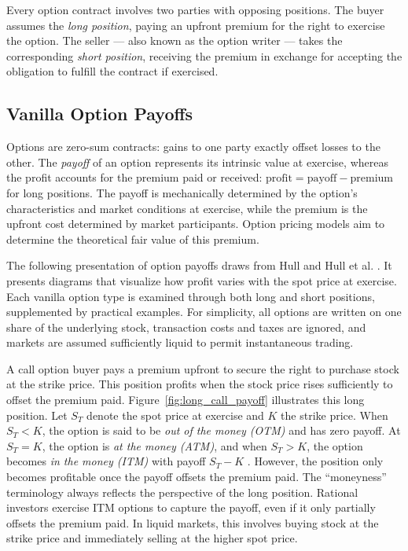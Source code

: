 \documentclass[english,12pt,a4paper,pdftex,sci,utf8]{aaltothesis}
\begin{document}
Every option contract involves two parties with opposing positions. The buyer assumes the \emph{long position}, paying an upfront premium for the right to exercise the option. The seller --- also known as the option writer --- takes the corresponding \emph{short position}, receiving the premium in exchange for accepting the obligation to fulfill the contract if exercised.

\clearpage
\subsection{Vanilla Option Payoffs}\label{subsec:payoffs}

Options are zero-sum contracts: gains to one party exactly offset losses to the other. The \emph{payoff} of an option represents its intrinsic value at exercise, whereas the profit accounts for the premium paid or received: \mbox{$\text{profit} = \text{payoff} - \text{premium}$} for long positions. The payoff is mechanically determined by the option's characteristics and market conditions at exercise, while the premium is the upfront cost determined by market participants. Option pricing models aim to determine the theoretical fair value of this premium.

The following presentation of option payoffs draws from Hull \cite{hull2016options} and Hull et al. \cite{hull2013fundamentals}. It presents diagrams that visualize how profit varies with the spot price at exercise. Each vanilla option type is examined through both long and short positions, supplemented by practical examples. For simplicity, all options are written on one share of the underlying stock, transaction costs and taxes are ignored, and markets are assumed sufficiently liquid to permit instantaneous trading.

A call option buyer pays a premium upfront to secure the right to purchase stock at the strike price. This position profits when the stock price rises sufficiently to offset the premium paid. Figure~\ref{fig:long_call_payoff} illustrates this long position. Let $S_T$ denote the spot price at exercise and $K$ the strike price. When $S_T < K$, the option is said to be \emph{out of the money (OTM)} and has zero payoff. At $S_T = K$, the option is \emph{at the money (ATM)}, and when $S_T > K$, the option becomes \emph{in the money (ITM)} with payoff $S_T - K$ \cite{hull2013fundamentals}. However, the position only becomes profitable once the payoff offsets the premium paid. The ``moneyness'' terminology always reflects the perspective of the long position. Rational investors exercise ITM options to capture the payoff, even if it only partially offsets the premium paid. In liquid markets, this involves buying stock at the strike price and immediately selling at the higher spot price.
\end{document}
